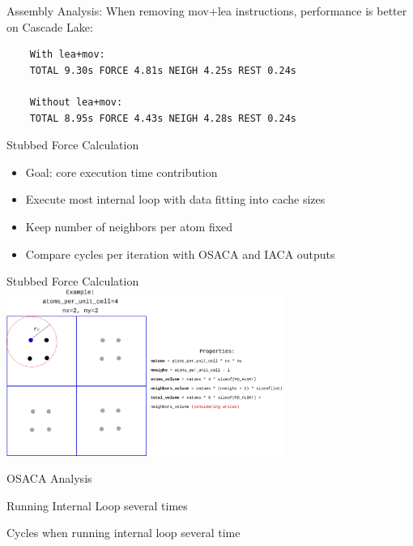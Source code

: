 \documentclass[aspectratio=43,t]{beamer}
\begin{document}
  \begin{frame}[fragile]{Assembly Analysis:}
    When removing mov+lea instructions, performance is better on Cascade Lake:
    \begin{verbatim}
    With lea+mov:
    TOTAL 9.30s FORCE 4.81s NEIGH 4.25s REST 0.24s

    Without lea+mov:
    TOTAL 8.95s FORCE 4.43s NEIGH 4.28s REST 0.24s
    \end{verbatim}
  \end{frame}

  \begin{frame}[fragile]{Stubbed Force Calculation}
    \begin{itemize}
      \item Goal: core execution time contribution
      \item Execute most internal loop with data fitting into cache sizes
      \item Keep number of neighbors per atom fixed
      \item Compare cycles per iteration with OSACA and IACA outputs
    \end{itemize}
  \end{frame}

  \begin{frame}{Stubbed Force Calculation}
  \centering
    \includegraphics[width=9cm]{stubbed_force_mdbench.png}
  \end{frame}

  \begin{frame}[fragile]{OSACA Analysis}
  \end{frame}

  \begin{frame}[fragile]{Running Internal Loop several times}
  \end{frame}

  \begin{frame}[fragile]{Cycles when running internal loop several time}
  \end{frame}
\end{document}
